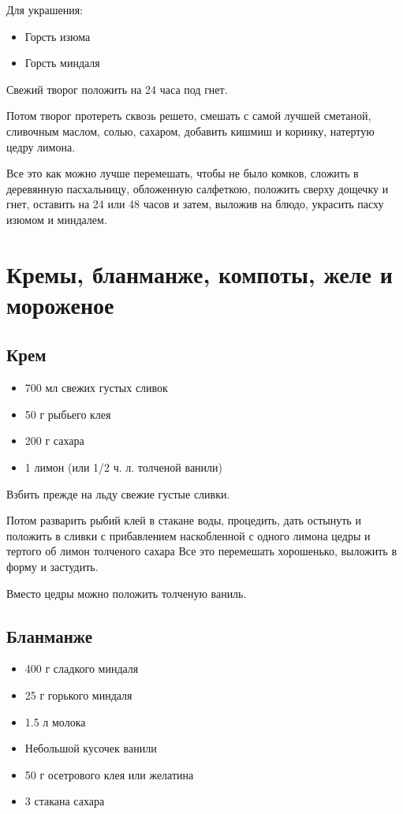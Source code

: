 Для украшения: 

\begin{itemize}
	\item Горсть изюма 
    \item Горсть миндаля
\end{itemize}

Свежий творог положить на 24 часа под гнет.

Потом творог протереть сквозь решето, смешать с самой лучшей сметаной, сливочным маслом, солью, сахаром, добавить кишмиш и коринку, натертую цедру лимона.

Все это как можно лучше перемешать, чтобы не было комков, сложить в деревянную пасхальницу, обложенную салфеткою, положить сверху дощечку и гнет, оставить на 24 или 48 часов и затем, выложив на блюдо, украсить пасху изюмом и миндалем.

\newpage
\section{Кремы, бланманже, компоты, желе и мороженое}

\subsection{Крем}

\begin{itemize}
	\item 700 мл свежих густых сливок 
    \item 50 г рыбьего клея 
    \item 200 г сахара 
    \item 1 лимон (или 1/2 ч. л. толченой ванили)
\end{itemize}

Взбить прежде на льду свежие густые сливки.

Потом разварить рыбий клей в стакане воды, процедить, дать остынуть и положить в сливки с прибавлением наскобленной с одного лимона цедры и тертого об лимон толченого сахара Все это перемешать хорошенько, выложить в форму и застудить.

Вместо цедры можно положить толченую ваниль.

\subsection{Бланманже}

\begin{itemize}
	\item 400 г сладкого миндаля
    \item 25 г горького миндаля
    \item 1.5 л молока 
    \item Небольшой кусочек ванили 
    \item 50 г осетрового клея или желатина 
    \item 3 стакана сахара
\end{itemize}

